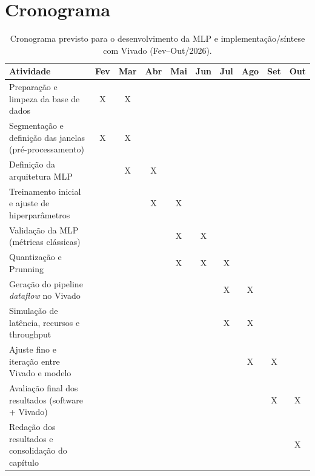 \chapter{Cronograma}

\begin{table}[H]
	\centering
	\footnotesize
	\caption{Cronograma previsto para o desenvolvimento da MLP e implementação/síntese com Vivado (Fev–Out/2026).}
	\renewcommand{\arraystretch}{1.3}
	\begin{tabular}{p{6cm} c c c c c c c c c}
		\toprule
		\textbf{Atividade} &
		\textbf{Fev} &
		\textbf{Mar} &
		\textbf{Abr} &
		\textbf{Mai} &
		\textbf{Jun} &
		\textbf{Jul} &
		\textbf{Ago} &
		\textbf{Set} &
		\textbf{Out} \\
		\midrule
		Preparação e limpeza da base de dados & X & X &   &   &   &   &   &   &   \\
		Segmentação e definição das janelas (pré-processamento) & X & X &   &   &   &   &   &   &   \\
		\midrule
		Definição da arquitetura MLP &   & X & X &   &   &   &   &   &   \\
		Treinamento inicial e ajuste de hiperparâmetros &   &   & X & X &   &   &   &   &   \\
		Validação da MLP (métricas clássicas) &   &   &   & X & X &   &   &   &   \\
		\midrule
		Quantização e Prunning &   &   &   & X & X & X  &   &   &   \\
		\midrule
		Geração do pipeline \textit{dataflow} no Vivado &   &   &   &   &   & X & X &   &   \\
		Simulação de latência, recursos e throughput &   &   &   &   &   & X & X &   &   \\
		Ajuste fino e iteração entre Vivado e modelo &   &   &   &   &   &   & X & X &   \\
		\midrule
		Avaliação final dos resultados (software + Vivado) &   &   &   &   &   &   &   & X & X \\
		Redação dos resultados e consolidação do capítulo &   &   &   &   &   &   &   &   & X \\
		\bottomrule
	\end{tabular}
\end{table}

